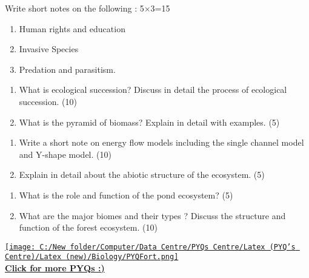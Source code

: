 \documentclass[12pt,a4paper]{article}
\begin{document}
\begin{questions}
    \vspace{\baselineskip}
    
    \item Write short notes on the following : \hfill 5×3=15
    \begin{enumerate}[label=(\roman*), leftmargin=2em]
    \item Human rights and education
    \item Invasive Species
    \item Predation and parasitism.
    \end{enumerate}

    \vspace{\baselineskip}
    
    \item \begin{enumerate}[label=(\alph*), leftmargin=2em]
        \item What is ecological succession? Discuss in detail the process of ecological succession. \hfill (10)
        \item What is the pyramid of biomass? Explain in detail with examples. \hfill (5)
    \end{enumerate}

    \vspace{\baselineskip}
    
    \item \begin{enumerate}[label=(\alph*), leftmargin=2em]
        \item Write a short note on energy flow models including the single channel model and Y-shape model. \hfill (10)
        \item Explain in detail about the abiotic structure of the ecosystem. \hfill (5)
    \end{enumerate}

    \vspace{\baselineskip}
    
    \item \begin{enumerate}[label=(\alph*), leftmargin=2em]
        \item What is the role and function of the pond ecosystem? \hfill (5)
        \item What are the major biomes and their types ? Discuss the structure and function of the  forest ecosystem. \hfill (10)
    \end{enumerate}

\end{questions}

\vspace{2\baselineskip}

\begin{center}
    \href{https://github.com/Saumy1905/PYQFort}{%
        \texttt{[image: C:/New folder/Computer/Data Centre/PYQs Centre/Latex (PYQ's Centre)/Latex (new)/Biology/PYQFort.png]} \\
        \vspace{0.5em}
        \textbf{Click for more PYQs :)}
    }
\end{center}
\end{document}
